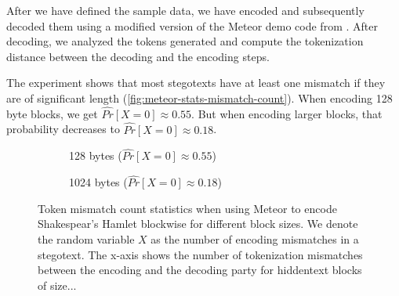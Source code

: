 After we have defined the sample data, we have encoded and subsequently decoded them using a modified version of the Meteor demo code from \cite{MeteorDemo2021}.
After decoding, we analyzed the tokens generated and compute the tokenization distance between the decoding and the encoding steps.

The experiment shows that most stegotexts have at least one mismatch if they are of significant length (\autoref{fig:meteor-stats-mismatch-count}).
When encoding 128 byte blocks, we get $\hat{Pr}[X=0] \approx 0.55$.
But when encoding larger blocks, that probability decreases to $\hat{Pr}[X=0] \approx 0.18$.

\begin{figure}[htbp]%
	\begin{subfigure}{.5\textwidth}%
		\centering%
	    \resizebox{0.9\linewidth}{!}{%
		}%
		\caption{128 bytes ($\hat{Pr}[X=0] \approx 0.55$)}%
	\end{subfigure}%
	\begin{subfigure}{.5\textwidth}%
		\centering%
	    \resizebox{0.9\linewidth}{!}{%
		}%
		\caption{1024 bytes ($\hat{Pr}[X=0] \approx 0.18$)}%
	\end{subfigure}%
	\caption{
	Token mismatch count statistics when using Meteor to encode Shakespear's Hamlet blockwise for different block sizes.
	We denote the random variable $X$ as the number of encoding mismatches in a stegotext.
	The x-axis shows the number of tokenization mismatches between the encoding and the decoding party for hiddentext blocks of size...}
	\label{fig:meteor-stats-mismatch-count}	
\end{figure}


